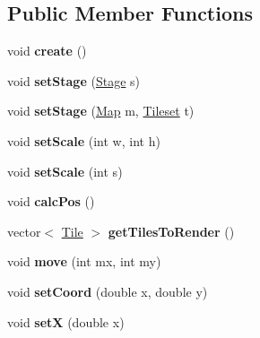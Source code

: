 \subsection*{Public Member Functions}
\begin{DoxyCompactItemize}
\item 
void {\bfseries create} ()\hypertarget{classLevel_a81689e48aaf6d5421721bd06f480e4e1}{}\label{classLevel_a81689e48aaf6d5421721bd06f480e4e1}

\item 
void {\bfseries set\+Stage} (\hyperlink{classStage}{Stage} s)\hypertarget{classLevel_ac9bb5473dece11462e702fe418590f24}{}\label{classLevel_ac9bb5473dece11462e702fe418590f24}

\item 
void {\bfseries set\+Stage} (\hyperlink{classMap}{Map} m, \hyperlink{classTileset}{Tileset} t)\hypertarget{classLevel_a962fd10cb871d2fdd98230dc079bff34}{}\label{classLevel_a962fd10cb871d2fdd98230dc079bff34}

\item 
void {\bfseries set\+Scale} (int w, int h)\hypertarget{classLevel_a3fcaa774a00e39090336b5a61d88e3e2}{}\label{classLevel_a3fcaa774a00e39090336b5a61d88e3e2}

\item 
void {\bfseries set\+Scale} (int s)\hypertarget{classLevel_af6fe8bc2dd6623fcbaa739403a239d77}{}\label{classLevel_af6fe8bc2dd6623fcbaa739403a239d77}

\item 
void {\bfseries calc\+Pos} ()\hypertarget{classLevel_a02e915f95e181dcfe95553e923a73a39}{}\label{classLevel_a02e915f95e181dcfe95553e923a73a39}

\item 
vector$<$ \hyperlink{classTile}{Tile} $>$ {\bfseries get\+Tiles\+To\+Render} ()\hypertarget{classLevel_ade9e45f70f2f3f81c120bb161f87218f}{}\label{classLevel_ade9e45f70f2f3f81c120bb161f87218f}

\item 
void {\bfseries move} (int mx, int my)\hypertarget{classLevel_a9184b25173fbf468a63a633bd3510bd6}{}\label{classLevel_a9184b25173fbf468a63a633bd3510bd6}

\item 
void {\bfseries set\+Coord} (double x, double y)\hypertarget{classLevel_a3ff79425060f959496d64aa052ef3cf6}{}\label{classLevel_a3ff79425060f959496d64aa052ef3cf6}

\item 
void {\bfseries setX} (double x)\hypertarget{classLevel_a6212b3c03b3efc82cf69e642cc093959}{}\label{classLevel_a6212b3c03b3efc82cf69e642cc093959}


\end{DoxyCompactItemize}
